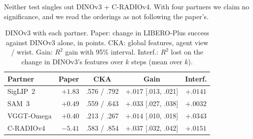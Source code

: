 Neither test singles out DINOv3 + C-RADIOv4.
With four partners we claim no significance, and we read the orderings as not following the paper's.

\begin{table}[t]
\centering
\footnotesize\setlength{\tabcolsep}{2.5pt}
\caption{DINOv3 with each partner. Paper: change in LIBERO-Plus success against DINOv3 alone, in points. CKA: global features, agent view / wrist. Gain: $R^2$ gain with 95\% interval. Interf.: $R^2$ lost on the change in DINOv3's features over $k$ steps (mean over $k$).}
\label{tab:clean}
\begin{tabular}{@{}lrccc@{}}
\toprule
Partner & Paper & CKA & Gain & Interf. \\
\midrule
SigLIP~2 & $+1.83$ & .576 / .792 & $+.017$ [.013, .021] & $+.0141$ \\
SAM~3 & $+0.49$ & .559 / .643 & $+.033$ [.027, .038] & $+.0032$ \\
VGGT-Omega & $+0.40$ & .213 / .267 & $+.014$ [.010, .018] & $+.0343$ \\
C-RADIOv4 & $-5.41$ & .583 / .854 & $+.037$ [.032, .042] & $+.0151$ \\
\bottomrule
\end{tabular}
\end{table}



